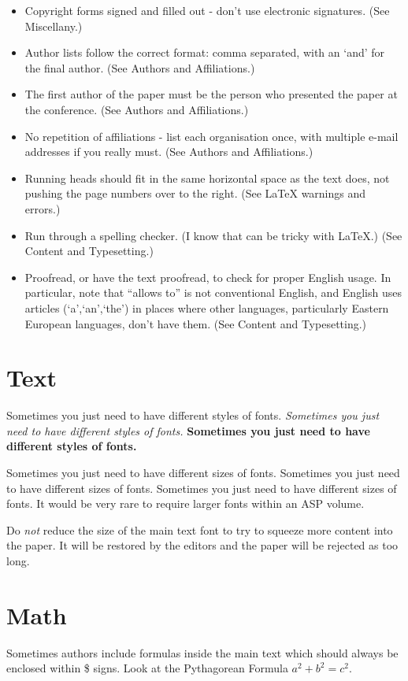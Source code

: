 \documentclass[11pt,twoside]{article}
\begin{document}
\begin{itemize}
\item Copyright forms signed and filled out - don't use electronic signatures. (See Miscellany.)
\item Author lists follow the correct format: comma separated, with an `and' for the final author. (See Authors and Affiliations.)
\item The first author of the paper must be the person who presented the paper at the conference. (See Authors and Affiliations.)
\item No repetition of affiliations - list each organisation once, with multiple e-mail addresses if you really must. (See Authors and Affiliations.)
\item Running heads should fit in the same horizontal space as the text does, not pushing the page numbers over to the right. (See LaTeX warnings and errors.)
\item Run through a spelling checker. (I know that can be tricky with LaTeX.) (See Content and Typesetting.)
\item Proofread, or have the text proofread, to check for proper English usage. In particular, note that ``allows to'' is not conventional English, and English uses articles (`a',`an',`the') in places where other languages, particularly Eastern European languages, don't have them. (See Content and Typesetting.)
\end{itemize}

\section{Text}
Sometimes you just need to have different styles of fonts.  \emph{Sometimes you just need to have different styles of fonts.} \textbf{Sometimes you just need to have different styles of fonts.}

Sometimes you just need to have different sizes of fonts.  {\small Sometimes you just need to have different sizes of fonts.} {\footnotesize Sometimes you just need to have different sizes of fonts.}  It would be very rare to require larger fonts within an ASP volume.

Do \emph{not} reduce the size of the main text font to try to squeeze more content into the paper. It will be restored by the editors and the paper will be rejected as too long.

\section{Math}
Sometimes authors include formulas inside the main text which should always be enclosed within \$ signs.  Look at the Pythagorean Formula $a^2 + b^2 = c^2$.
\end{document}

